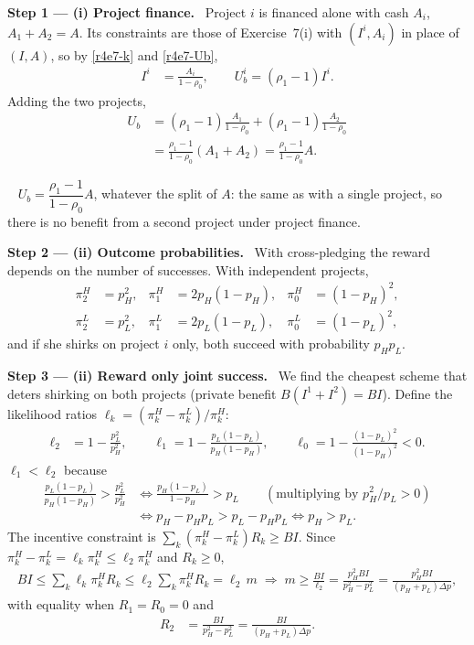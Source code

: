 \documentclass[11pt,a4paper]{article}
\newcommand{\step}[2]{\par\medskip\noindent\textbf{Step #1 --- #2.}~}
\newcommand{\answer}[1]{\par\smallskip\noindent\fbox{\textbf{Answer #1.}}~}
\begin{document}
\step{1}{(i) Project finance} Project $i$ is financed alone with cash $A_i$, $A_1+A_2=A$. Its
constraints are those of Exercise~7(i) with $(I^i,A_i)$ in place of $(I,A)$, so by \eqref{r4e7-k}
and \eqref{r4e7-Ub},
\begin{align}
  I^i &= \frac{A_i}{1-\rho_0}, \qquad U_b^i=(\rho_1-1)I^i. \nonumber
\end{align}
Adding the two projects,
\begin{align}
  U_b &= (\rho_1-1)\frac{A_1}{1-\rho_0}+(\rho_1-1)\frac{A_2}{1-\rho_0} \nonumber\\
      &= \frac{\rho_1-1}{1-\rho_0}(A_1+A_2) = \frac{\rho_1-1}{1-\rho_0}A. \label{r4e13-pf}
\end{align}

\answer{(i)} $U_b=\dfrac{\rho_1-1}{1-\rho_0}A$, whatever the split of $A$: the same as with a
single project, so there is no benefit from a second project under project finance.

\step{2}{(ii) Outcome probabilities} With cross-pledging the reward depends on the number of
successes. With independent projects,
\begin{align}
  \pi_2^H &= p_H^2, & \pi_1^H &= 2p_H(1-p_H), & \pi_0^H &= (1-p_H)^2, \nonumber\\
  \pi_2^L &= p_L^2, & \pi_1^L &= 2p_L(1-p_L), & \pi_0^L &= (1-p_L)^2, \nonumber
\end{align}
and if she shirks on project $i$ only, both succeed with probability $p_Hp_L$.

\step{3}{(ii) Reward only joint success} We find the cheapest scheme that deters shirking on both
projects (private benefit $B(I^1+I^2)=BI$). Define the likelihood ratios
$\ell_k=(\pi_k^H-\pi_k^L)/\pi_k^H$:
\begin{align}
  \ell_2 &= 1-\frac{p_L^2}{p_H^2}, \qquad
  \ell_1 = 1-\frac{p_L(1-p_L)}{p_H(1-p_H)}, \qquad
  \ell_0 = 1-\frac{(1-p_L)^2}{(1-p_H)^2}<0. \nonumber
\end{align}
$\ell_1<\ell_2$ because
\begin{align}
  \frac{p_L(1-p_L)}{p_H(1-p_H)}>\frac{p_L^2}{p_H^2}
  &\iff \frac{p_H(1-p_L)}{1-p_H}>p_L \qquad(\text{multiplying by }p_H^2/p_L>0) \nonumber\\
  &\iff p_H-p_Hp_L>p_L-p_Hp_L \iff p_H>p_L. \nonumber
\end{align}
The incentive constraint is $\sum_k(\pi_k^H-\pi_k^L)R_k\ge BI$. Since $\pi_k^H-\pi_k^L=\ell_k\pi_k^H\le\ell_2\pi_k^H$
and $R_k\ge 0$,
\begin{align}
  BI \le \sum_k\ell_k\pi_k^HR_k \le \ell_2\sum_k\pi_k^HR_k = \ell_2\,m
  \;\Rightarrow\; m\ge\frac{BI}{\ell_2}=\frac{p_H^2BI}{p_H^2-p_L^2}=\frac{p_H^2BI}{(p_H+p_L)\Delta p}, \label{r4e13-m}
\end{align}
with equality when $R_1=R_0=0$ and
\begin{align}
  R_2 &= \frac{BI}{p_H^2-p_L^2}=\frac{BI}{(p_H+p_L)\Delta p}. \label{r4e13-R2}
\end{align}
\end{document}
